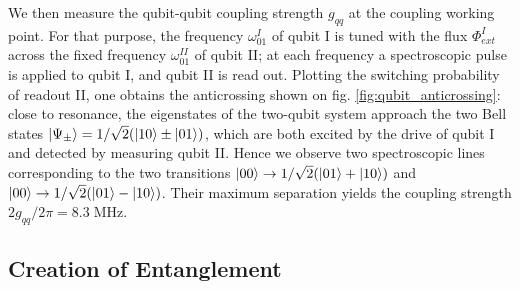 We then measure the qubit-qubit coupling strength $g_{qq}$ at the coupling working point. For that purpose, the frequency $\omega_{01}^I$ of qubit I is tuned with the flux $\Phi_{ext}^I$ across the fixed frequency $\omega_{01}^{II}$ of qubit II; at each frequency a spectroscopic pulse is applied to qubit I, and qubit II is read out. Plotting the switching probability of  readout II, one obtains the anticrossing shown on fig. \ref{fig:qubit_anticrossing}: close to resonance, the eigenstates of the two-qubit system approach the two Bell states $\left| \Psi_\pm \right> = 1/\sqrt{2}(\left| 10 \right>\pm\left| 01 \right>)$, which are both excited by the drive of qubit I and detected by measuring qubit II. Hence we observe two spectroscopic lines corresponding to the two transitions $\left| 00 \right>\to 1/\sqrt{2}(\left| 01 \right>+\left| 10 \right>)$ and $\left| 00 \right>\to 1/\sqrt{2}(\left| 01 \right>-\left| 10 \right>)$. Their maximum separation yields the coupling strength $2g_{qq}/2\pi = 8.3\;\mathrm{MHz}$.

\subsection{Creation of Entanglement} \label{section:creation_of_entanglement}

